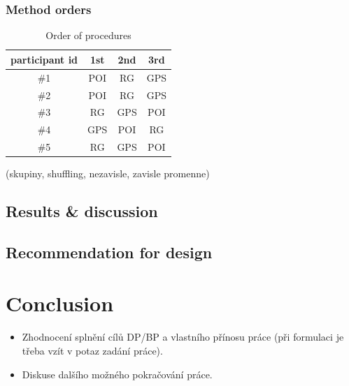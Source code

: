 \documentclass[11pt,twoside,a4paper]{book}
\begin{document}
	\subsection{Method orders}
	\begin{table}[]
		\centering
		\caption{Order of procedures}
		\label{my-label}
		\begin{tabular}{@{}cccc@{}}
			\toprule
			\textbf{participant id} & \textbf{1st} & \textbf{2nd} & \textbf{3rd} \\ \midrule
			\#1                     & POI          & RG           & GPS          \\
			\#2                     & POI          & RG           & GPS          \\
			\#3                     & RG           & GPS          & POI          \\
			\#4                     & GPS          & POI          & RG           \\
			\#5                     & RG           & GPS          & POI          \\ \bottomrule
		\end{tabular}
	\end{table}
	
	(skupiny, shuffling, nezavisle, zavisle promenne)
	\section{Results \& discussion}
	\section{Recommendation for design}
	
	
	\chapter{Conclusion}
	
	\begin{itemize}
		\item Zhodnocení splnění cílů DP/BP a  vlastního přínosu práce (při formulaci je třeba vzít v potaz zadání práce).
		\item Diskuse dalšího možného pokračování práce.
	\end{itemize} 
	
\end{document}
